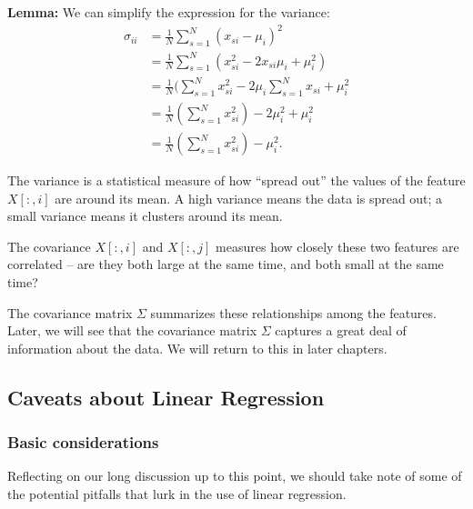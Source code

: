 \documentclass[
]{article}
\begin{document}
\textbf{Lemma:} We can simplify the expression for the variance:
\[\begin{aligned}
\sigma_{ii} &= \frac{1}{N}\sum_{s=1}^{N} (x_{si}-\mu_{i})^2\\
&=\frac{1}{N}\sum_{s=1}^{N}( x_{si}^2-2x_{si}\mu_{i}+\mu_{i}^2)\\
&=\frac{1}{N}(\sum_{s=1}^{N} x_{si}^2  -2\mu_{i}\sum_{s=1}^{N} x_{si}+\mu_{i}^2 \\
&=\frac{1}{N}(\sum_{s=1}^{N} x_{si}^2) -2\mu_{i}^2 + \mu_{i}^2 \\
&=\frac{1}{N}(\sum_{s=1}^{N} x_{si}^2) -\mu_{i}^2 .
\end{aligned}
\]

The variance is a statistical measure of how ``spread out'' the values
of the feature \(X[:,i]\) are around its mean. A high variance means the
data is spread out; a small variance means it clusters around its mean.

The covariance \(X[:,i]\) and \(X[:,j]\) measures how closely these two
features are correlated -- are they both large at the same time, and
both small at the same time?

The covariance matrix \(\Sigma\) summarizes these relationships among
the features. Later, we will see that the covariance matrix \(\Sigma\)
captures a great deal of information about the data. We will return to
this in later chapters.

\hypertarget{caveats-about-linear-regression}{%
\subsection{Caveats about Linear
Regression}\label{caveats-about-linear-regression}}

\hypertarget{basic-considerations}{%
\subsubsection{Basic considerations}\label{basic-considerations}}

Reflecting on our long discussion up to this point, we should take note
of some of the potential pitfalls that lurk in the use of linear
regression.
\end{document}
